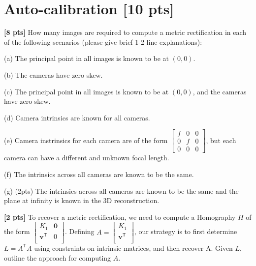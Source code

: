 \documentclass[11pt,addpoints,answers]{exam}
\numberwithin{equation}{section} %
\numberwithin{figure}{section} %
\numberwithin{table}{section} %
\begin{document}
\section{Auto-calibration [10 pts]}
\begin{questions}

\question \textbf{[8 pts]} How many images are required to compute a metric rectification in each of the following scenarios (please give brief 1-2 line explanations):

(a) The principal point in all images is known to be at $(0,0)$.

(b) The cameras have zero skew.

(c) The principal point in all images is known to be at $(0,0)$, and the cameras have zero skew.

(d)  Camera intrinsics are known for all cameras.

(e) Camera instrinsics for each camera are of the form
$
\begin{bmatrix}
f & 0 & 0 \\
0 & f & 0 \\
0 & 0 & 0
\end{bmatrix}$, but each camera can have a different and unknown focal length.

(f) The intrinsics across all cameras are known to be the same.

(g) (2pts) The intrinsics across all cameras are known to be the same and the plane at infinity is known in the 3D reconstruction.

\begin{tcolorbox}[fit,height=11cm, width=\textwidth, blank, borderline={0.5pt}{-2pt},halign=left, valign=center, nobeforeafter]

\end{tcolorbox}

\newpage

\question \textbf{[2 pts]} To recover a metric rectification, we need to compute a Homography $H$ of the form $\begin{bmatrix}
K_1 & \mathbf{0} \\
\mathbf{v}^{\mathsf{T}} & 0 \\
\end{bmatrix}$. Defining $A=\begin{bmatrix}
K_1 \\
\mathbf{v}^{\mathsf{T}} \\
\end{bmatrix}$, our strategy is to first determine $L=A^{\mathsf{T}}A$ using constraints on intrinsic matrices, and then recover A. Given $L$, outline the approach for computing $A$.


\end{questions}
\end{document}
